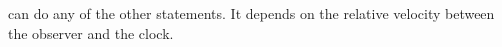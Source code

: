can do any of the other statements. 
It depends on the relative velocity between the observer and the clock.
